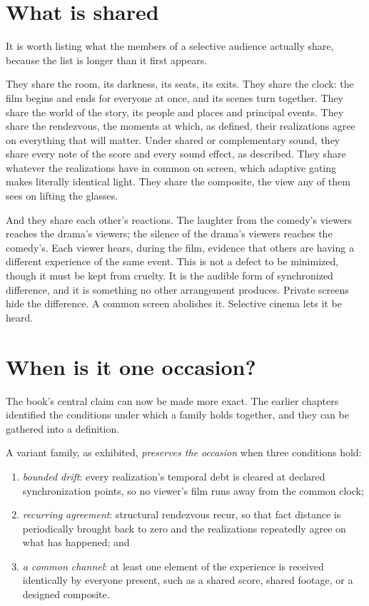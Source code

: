 \section{What is shared}

It is worth listing what the members of a selective audience actually share, because the list is longer than it first appears.

They share the room, its darkness, its seats, its exits. They share the clock: the film begins and ends for everyone at once, and its scenes turn together. They share the world of the story, its people and places and principal events. They share the rendezvous, the moments at which, as  defined, their realizations agree on everything that will matter. Under shared or complementary sound, they share every note of the score and every sound effect, as  described. They share whatever the realizations have in common on screen, which adaptive gating makes literally identical light. They share the composite, the view any of them sees on lifting the glasses.

And they share each other's reactions. The laughter from the comedy's viewers reaches the drama's viewers; the silence of the drama's viewers reaches the comedy's. Each viewer hears, during the film, evidence that others are having a different experience of the same event. This is not a defect to be minimized, though it must be kept from cruelty. It is the audible form of synchronized difference, and it is something no other arrangement produces. Private screens hide the difference. A common screen abolishes it. Selective cinema lets it be heard.

\section{When is it one occasion?}

The book's central claim can now be made more exact. The earlier chapters identified the conditions under which a family holds together, and they can be gathered into a definition.

\begin{definition}
A variant family, as exhibited, \emph{preserves the occasion} when three conditions hold:
\begin{enumerate}
\item \emph{bounded drift}: every realization's temporal debt is cleared at declared synchronization points, so no viewer's film runs away from the common clock;
\item \emph{recurring agreement}: structural rendezvous recur, so that fact distance is periodically brought back to zero and the realizations repeatedly agree on what has happened; and
\item \emph{a common channel}: at least one element of the experience is received identically by everyone present, such as a shared score, shared footage, or a designed composite.
\end{enumerate}
\end{definition}

